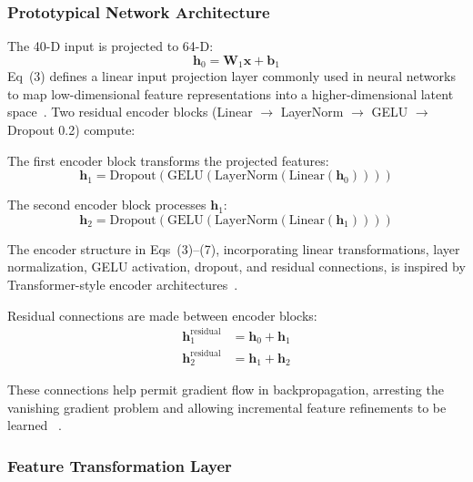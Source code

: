 \documentclass[10pt,letterpaper]{article}
\begin{document}
\subsubsection*{\textbf{Prototypical Network Architecture}}
The 40-D input is projected to 64-D:
\begin{equation}
\mathbf{h}_0 = \mathbf{W}_1 \mathbf{x} + \mathbf{b}_1
\end{equation}
Eq~(3) defines a linear input projection layer commonly used in neural networks to map low-dimensional feature representations into a higher-dimensional latent space~\cite{ref49}. Two residual encoder blocks (Linear $\rightarrow$ LayerNorm $\rightarrow$ GELU $\rightarrow$ Dropout 0.2) compute:

The first encoder block transforms the projected features:
\begin{equation}
    \mathbf{h}_1 = \text{Dropout}\left(\text{GELU}\left(\text{LayerNorm}\left(\text{Linear}(\mathbf{h}_0)\right)\right)\right)
\end{equation}

The second encoder block processes $\mathbf{h}_1$:
\begin{equation}
    \mathbf{h}_2 = \text{Dropout}\left(\text{GELU}\left(\text{LayerNorm}\left(\text{Linear}(\mathbf{h}_1)\right)\right)\right)
\end{equation}

The encoder structure in Eqs~(3)--(7), incorporating linear transformations, layer normalization, GELU activation, dropout, and residual connections, is inspired by Transformer-style encoder architectures~\cite{ref50}.

Residual connections are made between encoder blocks:
\begin{align}
    \mathbf{h}_1^{\text{residual}} &= \mathbf{h}_0 + \mathbf{h}_1 \\
    \mathbf{h}_2^{\text{residual}} &= \mathbf{h}_1 + \mathbf{h}_2
\end{align}

These connections help permit gradient flow in backpropagation, arresting the vanishing gradient problem and allowing incremental feature refinements to be learned ~\cite{ref50}.
\subsubsection*{\textbf{Feature Transformation Layer}}
\end{document}
